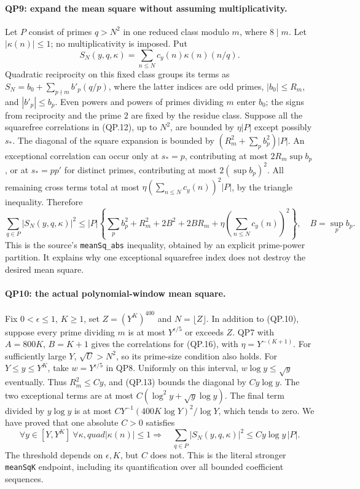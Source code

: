 \paragraph{QP9: expand the mean square without assuming multiplicativity.}
Let $P$ consist of primes $q>N^2$ in one reduced class modulo $m$,
where $8\mid m$.  Let $|\kappa(n)|\le1$; no multiplicativity is imposed.
Put
\[
 S_N(y,q,\kappa)=\sum_{n\le N}c_y(n)\kappa(n)(n/q).
\]
Quadratic reciprocity on this fixed class groups its terms as
$S_N=b_0+\sum_{p\nmid m}b'_p(q/p)$, where the latter indices are odd
primes, $|b_0|\le R_m$, and $|b'_p|\le b_p$.
Even powers and powers of primes dividing $m$ enter $b_0$; the signs
from reciprocity and the prime $2$ are fixed by the residue class.
Suppose all the squarefree correlations in (QP.12), up to $N^2$, are
bounded by $\eta|P|$ except possibly $s_*$.
The diagonal of the square expansion is bounded by
$(R_m^2+\sum_pb_p^2)|P|$.
An exceptional correlation can occur only at $s_*=p$, contributing
at most $2R_m\sup b_p$, or at $s_*=pp'$ for distinct primes,
contributing at most $2(\sup b_p)^2$.
All remaining cross terms total at most
$\eta(\sum_{n\le N}c_y(n))^2|P|$, by the triangle inequality.
Therefore
\[
 \sum_{q\in P}|S_N(y,q,\kappa)|^2\le |P|\left\{
 \sum_pb_p^2+R_m^2+2B^2+2BR_m+
                        \eta\left(\sum_{n\le N}c_y(n)\right)^2\right\},
 \quad B=\sup_pb_p.                                    \tag{QP.16}
\]
This is the source's \texttt{meanSq\_abs} inequality, obtained by an
explicit prime-power partition.  It explains why one exceptional
squarefree index does not destroy the desired mean square.

\paragraph{QP10: the actual polynomial-window mean square.}
Fix $0<\epsilon\le1$, $K\ge1$, set $Z=(Y^K)^{400}$ and
$N=\lfloor Z\rfloor$.  In addition to (QP.10), suppose every prime
dividing $m$ is at most $Y^{\epsilon/5}$ or exceeds $Z$.
QP7 with $A=800K$, $B=K+1$ gives the correlations for (QP.16), with
$\eta=Y^{-(K+1)}$.  For sufficiently large $Y$,
$\sqrt U>N^2$, so its prime-size condition also holds.
For $Y\le y\le Y^K$, take $w=Y^{\epsilon/5}$ in QP8.
Uniformly on this interval, $w\log y\le\sqrt y$ eventually.
Thus $R_m^2\le Cy$, and (QP.13) bounds the diagonal by $Cy\log y$.
The two exceptional terms are at most $C(\log^2y+\sqrt y\log y)$.
The final term divided by $y\log y$ is at most
$CY^{-1}(400K\log Y)^2/\log Y$, which tends to zero.
We have proved that one absolute $C>0$ satisfies
\[
 \forall y\in[Y,Y^K]\ \forall\kappa,quad |\kappa(n)|\le1
 \Longrightarrow\quad
 \sum_{q\in P}|S_N(y,q,\kappa)|^2\le Cy\log y\,|P|.   \tag{QP.17}
\]
The threshold depends on $\epsilon,K$, but $C$ does not.
This is the literal stronger \texttt{meanSqK} endpoint, including its
quantification over all bounded coefficient sequences.

